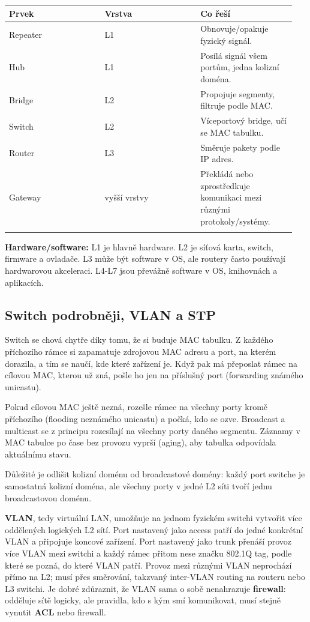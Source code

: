 \documentclass[11pt,a4paper]{article}
\newcommand{\itbox}[1]{\medskip\noindent\colorbox{black!6}{\parbox{\dimexpr\linewidth-2\fboxsep}{#1}}\medskip}
\begin{document}
\begin{longtable}{p{0.317\linewidth}p{0.317\linewidth}p{0.317\linewidth}}
\toprule
\textbf{Prvek} & \textbf{Vrstva} & \textbf{Co řeší} \\
\midrule\endhead
Repeater & L1 & Obnovuje/opakuje fyzický signál. \\
\addlinespace
Hub & L1 & Posílá signál všem portům, jedna kolizní doména. \\
\addlinespace
Bridge & L2 & Propojuje segmenty, filtruje podle MAC. \\
\addlinespace
Switch & L2 & Víceportový bridge, učí se MAC tabulku. \\
\addlinespace
Router & L3 & Směruje pakety podle IP adres. \\
\addlinespace
Gateway & vyšší vrstvy & Překládá nebo zprostředkuje komunikaci mezi různými protokoly/systémy. \\
\addlinespace
\bottomrule
\end{longtable}

\itbox{\textbf{Hardware/software:} L1 je hlavně hardware. L2 je síťová karta, switch, firmware a ovladače. L3 může být software v OS, ale routery často používají hardwarovou akceleraci. L4-L7 jsou převážně software v OS, knihovnách a aplikacích.}

\subsection*{Switch podrobněji, VLAN a STP}

Switch se chová chytře díky tomu, že si buduje MAC tabulku. Z každého příchozího rámce si zapamatuje zdrojovou MAC adresu a port, na kterém dorazila, a tím se naučí, kde které zařízení je. Když pak má přeposlat rámec na cílovou MAC, kterou už zná, pošle ho jen na příslušný port (forwarding známého unicastu).

Pokud cílovou MAC ještě nezná, rozešle rámec na všechny porty kromě příchozího (flooding neznámého unicastu) a počká, kdo se ozve. Broadcast a multicast se z principu rozesílají na všechny porty daného segmentu. Záznamy v MAC tabulce po čase bez provozu vyprší (aging), aby tabulka odpovídala aktuálnímu stavu.

Důležité je odlišit kolizní doménu od broadcastové domény: každý port switche je samostatná kolizní doména, ale všechny porty v jedné L2 síti tvoří jednu broadcastovou doménu.

\textbf{VLAN}, tedy virtuální LAN, umožňuje na jednom fyzickém switchi vytvořit více oddělených logických L2 sítí. Port nastavený jako access patří do jedné konkrétní VLAN a připojuje koncové zařízení. Port nastavený jako trunk přenáší provoz více VLAN mezi switchi a každý rámec přitom nese značku 802.1Q tag, podle které se pozná, do které VLAN patří. Provoz mezi různými VLAN neprochází přímo na L2; musí přes směrování, takzvaný inter-VLAN routing na routeru nebo L3 switchi. Je dobré zdůraznit, že VLAN sama o sobě nenahrazuje \textbf{firewall}: odděluje sítě logicky, ale pravidla, kdo s kým smí komunikovat, musí stejně vynutit \textbf{ACL} nebo firewall.
\end{document}
